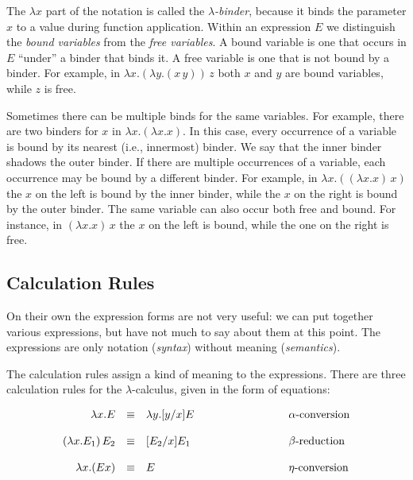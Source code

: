 The $\lambda x$ part of the notation is called the
\emph{$\lambda$-binder}, because it binds the parameter $x$ to a value during function application.
Within an expression $E$ we distinguish the \emph{bound variables} from the \emph{free variables}.
A bound variable is one that occurs in $E$ ``under'' a binder that binds it.
A free variable is one that is not bound by a binder. For example,
in $\lambda x.(\lambda y.(x\,y))\,z$ both
$x$ and $y$ are bound variables, while $z$ is free. 

Sometimes there can be multiple binds for the same variables. For example,
there are two binders for $x$ in $\lambda x.(\lambda x.x)$. In this case,
every occurrence of a variable is bound by its nearest (i.e., innermost) binder.
We say that the inner binder shadows the outer binder.
If there are multiple occurrences of a variable, each occurrence may be bound by
a different binder. For example, in $\lambda x.((\lambda x.x)\,x)$ the $x$ on the left
is bound by the inner binder, while the $x$ on the right is bound by the outer binder.
The same variable can also occur both free and bound. For instance, in $(\lambda x.x)\,x$
the $x$ on the left is bound, while the one on the right is free.

\subsection{Calculation Rules}

On their own the expression forms are not very useful: we can put together
various expressions, but have not much to say about them at this point.
The expressions are only notation (\textit{syntax}) without meaning (\textit{semantics}).

The calculation rules assign a kind of meaning to the expressions. There are three
calculation rules for the $\lambda$-calculus, given in the form of equations:

\begin{framed}
\begin{equation*}
\begin{array}{rcl@{\hspace{3cm}}l}
 \lambda x.E & \equiv & \lambda y.[y/x]E           & \text{$\alpha$-conversion} \\ \\
(\lambda x.E_1)\,E_2 & \equiv & [E_2/x]E_1         & \text{$\beta$-reduction}   \\ \\
\lambda x.(E x) & \equiv & E         & \text{$\eta$-conversion}   
\end{array}
\end{equation*}
\end{framed}

